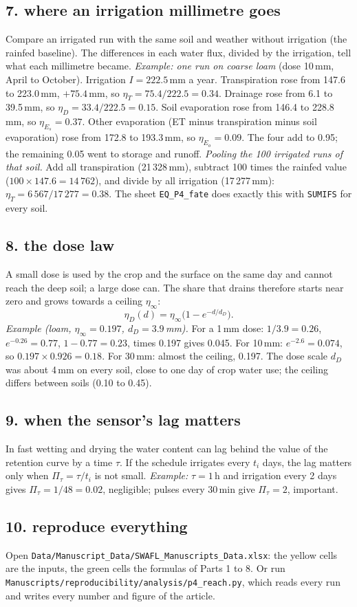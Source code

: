 \subsection{7. where an irrigation millimetre goes}
Compare an irrigated run with the same soil and weather without irrigation (the rainfed baseline). The differences in each water flux, divided by the irrigation, tell what each millimetre became.
\emph{Example: one run on coarse loam} (dose 10\,mm, April to October). Irrigation $I=222.5$\,mm a year. Transpiration rose from 147.6 to 223.0\,mm, $+75.4$\,mm, so $\eta_T=75.4/222.5=0.34$. Drainage rose from 6.1 to 39.5\,mm, so $\eta_D=33.4/222.5=0.15$. Soil evaporation rose from 146.4 to 228.8\,mm, so $\eta_{E_s}=0.37$. Other evaporation (ET minus transpiration minus soil evaporation) rose from 172.8 to 193.3\,mm, so $\eta_{E_o}=0.09$. The four add to 0.95; the remaining 0.05 went to storage and runoff.
\emph{Pooling the 100 irrigated runs of that soil.} Add all transpiration (21\,328\,mm), subtract 100 times the rainfed value ($100\times147.6=14\,762$), and divide by all irrigation (17\,277\,mm): $\eta_T=6\,567/17\,277=0.38$. The sheet \texttt{EQ\_P4\_fate} does exactly this with \texttt{SUMIFS} for every soil.

\subsection{8. the dose law}
A small dose is used by the crop and the surface on the same day and cannot reach the deep soil; a large dose can. The share that drains therefore starts near zero and grows towards a ceiling $\eta_\infty$:
\[\eta_D(d)=\eta_\infty\bigl(1-e^{-d/d_D}\bigr).\]
\emph{Example (loam, $\eta_\infty=0.197$, $d_D=3.9$\,mm).} For a 1\,mm dose: $1/3.9=0.26$, $e^{-0.26}=0.77$, $1-0.77=0.23$, times 0.197 gives 0.045. For 10\,mm: $e^{-2.6}=0.074$, so $0.197\times0.926=0.18$. For 30\,mm: almost the ceiling, 0.197. The dose scale $d_D$ was about 4\,mm on every soil, close to one day of crop water use; the ceiling differs between soils (0.10 to 0.45).

\subsection{9. when the sensor's lag matters}
In fast wetting and drying the water content can lag behind the value of the retention curve by a time $\tau$. If the schedule irrigates every $t_i$ days, the lag matters only when $\Pi_\tau=\tau/t_i$ is not small. \emph{Example:} $\tau=1$\,h and irrigation every 2 days gives $\Pi_\tau=1/48=0.02$, negligible; pulses every 30\,min give $\Pi_\tau=2$, important.

\subsection{10. reproduce everything}
Open \nolinkurl{Data/Manuscript_Data/SWAFL_Manuscripts_Data.xlsx}: the yellow cells are the inputs, the green cells the formulas of Parts 1 to 8. Or run \nolinkurl{Manuscripts/reproducibility/analysis/p4_reach.py}, which reads every run and writes every number and figure of the article.

